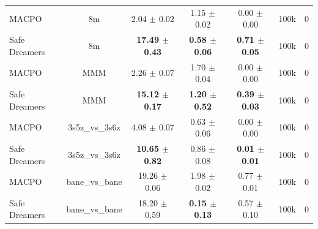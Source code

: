 \documentclass{article}
\begin{document}
\begin{longtable}{lcccccc}
\midrule
MACPO & 8m & 2.04 $\pm$ 0.02 & 1.15 $\pm$ 0.02 & 0.00 $\pm$ 0.00 & 100k & 0 \\
Safe Dreamers & 8m & \textbf{17.49 $\pm$ 0.43} & \textbf{0.58 $\pm$ 0.06} & \textbf{0.71 $\pm$ 0.05} & 100k & 0 \\
\midrule
MACPO & MMM & 2.26 $\pm$ 0.07 & 1.70 $\pm$ 0.04 & 0.00 $\pm$ 0.00 & 100k & 0 \\
Safe Dreamers & MMM & \textbf{15.12 $\pm$ 0.17} & \textbf{1.20 $\pm$ 0.52} & \textbf{0.39 $\pm$ 0.03} & 100k & 0 \\
\midrule
MACPO & 3s5z\_vs\_3s6z & 4.08 $\pm$ 0.07 & 0.63 $\pm$ 0.06 & 0.00 $\pm$ 0.00 & 100k & 0 \\
Safe Dreamers & 3s5z\_vs\_3s6z & \textbf{10.65 $\pm$ 0.82} & 0.86 $\pm$ 0.08 & \textbf{0.01 $\pm$ 0.01} & 100k & 0 \\
\midrule
MACPO & bane\_vs\_bane & 19.26 $\pm$ 0.06 & 1.98 $\pm$ 0.02 & 0.77 $\pm$ 0.01 & 100k & 0 \\
Safe Dreamers & bane\_vs\_bane & 18.20 $\pm$ 0.59 & \textbf{0.15 $\pm$ 0.13} & 0.57 $\pm$ 0.10 & 100k & 0 \\
\end{longtable}
\end{document}
